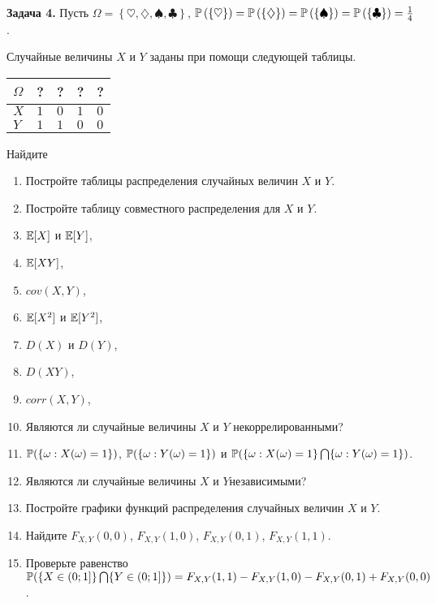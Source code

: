 \textbf{Задача 4.} Пусть $\Omega =\left\{\heartsuit ,\diamondsuit ,\spadesuit ,\clubsuit \right\}$, ${\rm {\mathbb P}}\left(\left\{\heartsuit \right\}\right)={\rm {\mathbb P}}\left(\left\{\diamondsuit \right\}\right)={\rm {\mathbb P}}\left(\left\{\spadesuit \right\}\right)={\rm {\mathbb P}}\left(\left\{\clubsuit \right\}\right)={\tfrac{1}{4}} $.

Случайные величины $X$ и $Y$ заданы при помощи следующей таблицы.

\begin{tabular}{|p{0.3in}|p{0.3in}|p{0.3in}|p{0.3in}|p{0.3in}|} \hline 
$\Omega $ & ? & ? & ? & ? \\ \hline 
$X$ & $1$ & $0$ & $1$ & $0$ \\ \hline 
$Y$ & $1$ & $1$ & $0$ & $0$ \\ \hline 
\end{tabular}

Найдите

\begin{enumerate}
\item  Постройте таблицы распределения случайных величин $X$ и $Y$.

\item  Постройте таблицу совместного распределения для $X$ и $Y$.

\item  ${\rm {\mathbb E}}[X]$ и ${\rm {\mathbb E}}[Y]$,

\item  ${\rm {\mathbb E}}[XY]$,

\item  $cov(X,Y)$,

\item  ${\rm {\mathbb E}}[X^{2} ]$ и ${\rm {\mathbb E}}[Y^{2} ]$,

\item  $D(X)$ и $D(Y)$,

\item  $D(XY)$,

\item  $corr(X,Y)$,

\item  Являются ли случайные величины $X$ и $Y$ некоррелированными?

\item  ${\rm {\mathbb P}}(\{ \omega :X(\omega )=1\} )$, ${\rm {\mathbb P}}(\{ \omega :Y(\omega )=1\} )$ и ${\rm {\mathbb P}}(\{ \omega :X(\omega )=1\} \bigcap \{ \omega :Y(\omega )=1\} )$.

\item  Являются ли случайные величины  $X$ и $Y$независимыми?

\item  Постройте графики функций распределения случайных величин $X$ и $Y$.

\item  Найдите $F_{X,Y} (0,0)$, $F_{X,Y} (1,0)$, $F_{X,Y} (0,1)$, $F_{X,Y} (1,1)$.

\item  Проверьте равенство ${\rm {\mathbb P}}(\{ X\in (0;1]\} \bigcap \{ Y\in (0;1]\} )=F_{X,Y} (1,1)-F_{X,Y} (1,0)-F_{X,Y} (0,1)+F_{X,Y} (0,0)$.
\end{enumerate}

